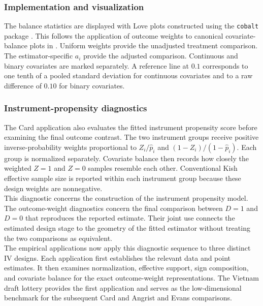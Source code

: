 \documentclass[12pt, a4paper, oneside]{article}
\theoremstyle{plain}
\theoremstyle{definition}
\begin{document}
\subsubsection{Implementation and visualization}
The balance statistics are displayed with Love plots constructed using the
\texttt{cobalt} package \citep{greifer2024cobalt}. This follows the application of
outcome weights to canonical covariate-balance plots in
\citet[Section~5]{knaus2024treatment}. Uniform weights provide the unadjusted
treatment comparison. The estimator-specific \(a_i\) provide the adjusted comparison.
Continuous and binary covariates are marked separately. A reference line at \(0.1\)
corresponds to one tenth of a pooled standard deviation for continuous covariates and
to a raw difference of \(0.10\) for binary covariates.



\subsubsection{Instrument-propensity diagnostics}

The Card application also evaluates the fitted instrument propensity score before
examining the final outcome contrast. The two instrument groups receive positive
inverse-probability weights proportional to
\(Z_i/\widehat p_i\) and \((1-Z_i)/(1-\widehat p_i)\). Each group is normalized
separately. Covariate balance then records how closely the weighted \(Z=1\) and
\(Z=0\) samples resemble each other. Conventional Kish effective sample size is
reported within each instrument group because these design weights are nonnegative.\\
This diagnostic concerns the construction of the instrument propensity model. The
outcome-weight diagnostics concern the final comparison between \(D=1\) and \(D=0\)
that reproduces the reported estimate. Their joint use connects the estimated design
stage to the geometry of the fitted estimator without treating the two comparisons as
equivalent.\\
The empirical applications now apply this diagnostic sequence to three distinct IV
designs. Each application first establishes the relevant data and point estimates. It
then examines normalization, effective support, sign composition, and covariate
balance for the exact outcome-weight representations. The Vietnam draft lottery
provides the first application and serves as the low-dimensional benchmark for the
subsequent Card and Angrist and Evans comparisons.
\end{document}

